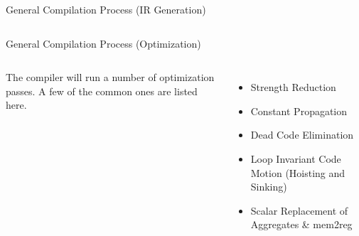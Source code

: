\documentclass{beamer}
\begin{document}
\begin{frame}[fragile]{General Compilation Process (IR Generation)}
\begin{columns}[T,onlytextwidth]
\end{columns}
\end{frame}

\begin{frame}[fragile]{General Compilation Process (Optimization)}
\begin{columns}[T,onlytextwidth]
        The compiler will run a number of optimization passes. A few of the common ones are listed here.
        \begin{itemize}
            \item Strength Reduction
            \item Constant Propagation
            \item Dead Code Elimination
            \item Loop Invariant Code Motion (Hoisting and Sinking)
            \item Scalar Replacement of Aggregates \& mem2reg
        \end{itemize}
\end{columns}
\end{frame}
\end{document}
